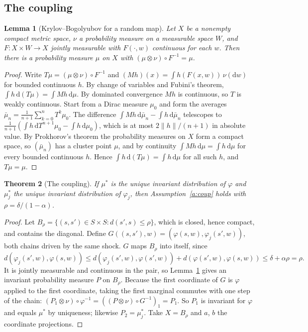 \documentclass[11pt]{article}
\newtheorem{theorem}{Theorem}
\newtheorem{lemma}[theorem]{Lemma}
\theoremstyle{definition}
\theoremstyle{remark}
\newcommand{\dd}{\mathrm{d}}
\begin{document}
\subsection{The coupling}

\begin{lemma}[Krylov--Bogolyubov for a random map]\label{lem:kb}
Let $X$ be a nonempty compact metric space, $\nu$ a probability measure on a measurable space $W$,
and $F: X \times W \to X$ jointly measurable with $F(\cdot,w)$ continuous for each $w$. Then there
is a probability measure $\mu$ on $X$ with $(\mu \otimes \nu)\circ F^{-1} = \mu$.
\end{lemma}

\begin{proof}
Write $T\mu = (\mu\otimes\nu)\circ F^{-1}$ and $(Mh)(x) = \int h(F(x,w))\,\nu(\dd w)$ for bounded
continuous $h$. By change of variables and Fubini's theorem, $\int h\,\dd(T\mu) =
\int Mh\,\dd\mu$. By dominated convergence $Mh$ is continuous, so $T$ is weakly continuous. Start
from a Dirac measure $\mu_0$ and form the averages $\bar\mu_n = \frac{1}{n+1}\sum_{k=0}^n
T^k\mu_0$. The difference $\int Mh\,\dd\bar\mu_n - \int h\,\dd\bar\mu_n$ telescopes to
$\frac1{n+1}(\int h\,\dd T^{n+1}\mu_0 - \int h\,\dd\mu_0)$, which is at most $2\|h\|/(n+1)$ in
absolute value. By Prokhorov's theorem the probability measures on $X$ form a compact space, so
$(\bar\mu_n)$ has a cluster point $\mu$, and by continuity $\int Mh\,\dd\mu = \int h\,\dd\mu$ for
every bounded continuous $h$. Hence $\int h\,\dd(T\mu) = \int h\,\dd\mu$ for all such $h$, and
$T\mu = \mu$.
\end{proof}

\begin{theorem}[The coupling]\label{thm:coupling}
If $\mu^*$ is the unique invariant distribution of $\varphi$ and $\mu_j^*$ the unique invariant
distribution of $\varphi_j$, then Assumption~\ref{a:coup} holds with $\rho = \delta/(1-\alpha)$.
\end{theorem}

\begin{proof}
Let $B_\rho = \{(s,s') \in S\times S : d(s',s) \le \rho\}$, which is closed, hence compact, and
contains the diagonal. Define $G((s,s'),w) = (\varphi(s,w), \varphi_j(s',w))$, both chains driven
by the same shock. $G$ maps $B_\rho$ into itself, since
\[
  d(\varphi_j(s',w), \varphi(s,w)) \le d(\varphi_j(s',w), \varphi(s',w)) +
  d(\varphi(s',w), \varphi(s,w)) \le \delta + \alpha\rho = \rho .
\]
It is jointly measurable and continuous in the pair, so Lemma~\ref{lem:kb} gives an invariant
probability measure $P$ on $B_\rho$. Because the first coordinate of $G$ is $\varphi$ applied to
the first coordinate, taking the first marginal commutes with one step of the chain:
$(P_1\otimes\nu)\circ\varphi^{-1} = ((P\otimes\nu)\circ G^{-1})_1 = P_1$. So $P_1$ is invariant
for $\varphi$ and equals $\mu^*$ by uniqueness; likewise $P_2 = \mu_j^*$. Take $X = B_\rho$ and
$a$, $b$ the coordinate projections.
\end{proof}
\end{document}
